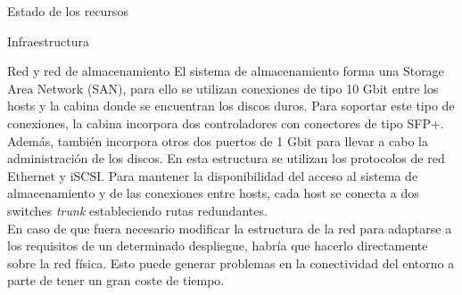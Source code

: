 \begin{chapter}{Estado de los recursos}
\begin{section}{Infraestructura}
\begin{subsection}{Red y red de almacenamiento}
    El sistema de almacenamiento forma una Storage Area Network (SAN), para ello se utilizan conexiones de tipo 10 Gbit entre los hosts y la cabina donde se encuentran los discos duros. Para soportar este tipo de conexiones, la cabina incorpora dos controladores con conectores de tipo SFP+. Además, también incorpora otros dos puertos de 1 Gbit para llevar a cabo la administración de los discos. En esta estructura se utilizan los protocolos de red Ethernet y iSCSI. Para mantener la disponibilidad del acceso al sistema de almacenamiento y de las conexiones entre hosts, cada host se conecta a dos switches \textit{trunk} estableciendo rutas redundantes.\\
    En caso de que fuera necesario modificar la estructura de la red para adaptarse a los requisitos de un determinado despliegue, habría que hacerlo directamente sobre la red física. Esto puede generar problemas en la conectividad del entorno a parte de tener un gran coste de tiempo.
\end{subsection}

\end{section}


\end{chapter}
